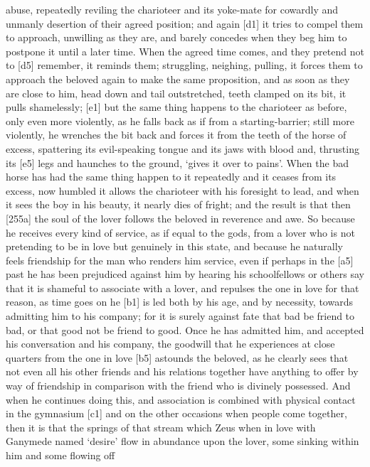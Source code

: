abuse, repeatedly reviling the charioteer and its yoke-mate for cowardly
and unmanly desertion of their agreed position; and again {[}d1{]} it
tries to compel them to approach, unwilling as they are, and barely
concedes when they beg him to postpone it until a later time. When the
agreed time comes, and they pretend not to {[}d5{]} remember, it reminds
them; struggling, neighing, pulling, it forces them to approach the
beloved again to make the same proposition, and as soon as they are
close to him, head down and tail outstretched, teeth clamped on its bit,
it pulls shamelessly; {[}e1{]} but the same thing happens to the
charioteer as before, only even more violently, as he falls back as if
from a starting-barrier; still more violently,
he wrenches the bit back and forces it from the teeth of the horse of
excess, spattering its evil-speaking tongue and its jaws with blood and,
thrusting its {[}e5{]} legs and haunches to the ground, ‘gives it over
to pains'. When the bad
horse has had the same thing happen to it repeatedly and it ceases from
its excess, now humbled it allows the charioteer with his foresight to
lead, and when it sees the boy in his beauty, it nearly dies of fright;
and the result is that then {[}255a{]} the soul of the lover follows the
beloved in reverence and awe. So because he receives every kind of
service, as if equal to the gods, from a lover who is not pretending to
be in love but genuinely in this state, and because he naturally feels
friendship for the man who renders him service, even if perhaps in the
{[}a5{]} past he has been prejudiced against him by hearing his
schoolfellows or others say that it is shameful to associate with a
lover, and repulses the one in love for that reason, as time goes on he
{[}b1{]} is led both by his age, and by necessity, towards admitting him
to his company; for it is surely against fate that bad be friend to bad,
or that good not be friend to good. Once he has admitted him, and
accepted his conversation and his company, the goodwill that he
experiences at close quarters from the one in love {[}b5{]} astounds the
beloved, as he clearly sees that not even all his other friends and his
relations together have anything to offer by way of friendship in
comparison with the friend who is divinely possessed. And when he
continues doing this, and association is combined with physical contact
in the gymnasium {[}c1{]} and on the other occasions when people come
together, then it is that the springs of that stream which Zeus when in
love with Ganymede named
‘desire' flow in
abundance upon the lover, some sinking within him and some flowing off

